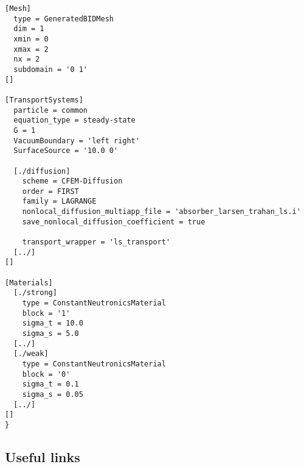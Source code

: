 \documentclass[10pt,letterpaper,oneside]{article}
\begin{document}
\begin{lstlisting}[style=moose,caption={Moose input example},label={lst:moose}]
[Mesh]
  type = GeneratedBIDMesh
  dim = 1
  xmin = 0
  xmax = 2
  nx = 2
  subdomain = '0 1'
[]

[TransportSystems]
  particle = common
  equation_type = steady-state
  G = 1
  VacuumBoundary = 'left right'
  SurfaceSource = '10.0 0'

  [./diffusion]
    scheme = CFEM-Diffusion
    order = FIRST
    family = LAGRANGE
    nonlocal_diffusion_multiapp_file = 'absorber_larsen_trahan_ls.i'
    save_nonlocal_diffusion_coefficient = true

    transport_wrapper = 'ls_transport'
  [../]
[]

[Materials]
  [./strong]
    type = ConstantNeutronicsMaterial
    block = '1'
    sigma_t = 10.0
    sigma_s = 5.0
  [../]
  [./weak]
    type = ConstantNeutronicsMaterial
    block = '0'
    sigma_t = 0.1
    sigma_s = 0.05
  [../]
[]
}
\end{lstlisting}

\subsection{Useful links}
\end{document}
